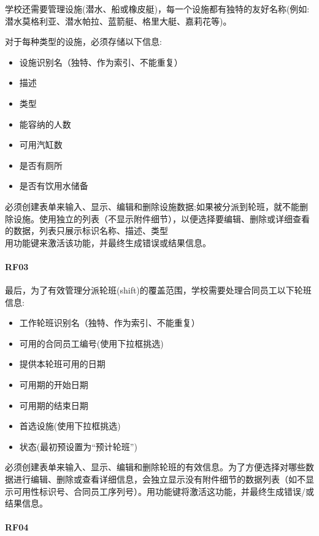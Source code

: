 学校还需要管理设施(潜水、船或橡皮艇)，每一个设施都有独特的友好名称(例如:潜水莫格利亚、潜水帕拉、蓝箭艇、格里大艇、嘉莉花等)。

对于每种类型的设施，必须存储以下信息:

\begin{itemize}
\tightlist
\item
  设施识别名（独特、作为索引、不能重复）
\item
  描述
\item
  类型
\item
  能容纳的人数
\item
  可用汽缸数
\item
  是否有厕所
\item
  是否有饮用水储备
\end{itemize}

必须创建表单来输入、显示、编辑和删除设施数据;如果被分派到轮班，就不能删除设施。使用独立的列表（不显示附件细节），以便选择要编辑、删除或详细查看的数据，列表只展示标识名称、描述、类型\\
用功能键来激活该功能，并最终生成错误或结果信息。

\hypertarget{rf03}{%
\paragraph{RF03}\label{rf03}}

最后，为了有效管理分派轮班(shift)的覆盖范围，学校需要处理合同员工以下轮班信息:

\begin{itemize}
\tightlist
\item
  工作轮班识别名（独特、作为索引、不能重复）
\item
  可用的合同员工编号(使用下拉框挑选)
\item
  提供本轮班可用的日期
\item
  可用期的开始日期
\item
  可用期的结束日期
\item
  首选设施(使用下拉框挑选)
\item
  状态(最初预设置为``预计轮班'')
\end{itemize}

必须创建表单来输入、显示、编辑和删除轮班的有效信息。为了方便选择对哪些数据进行编辑、删除或查看详细信息，会独立显示没有附件细节的数据列表（如不显示可用性标识号、合同员工序列号）。用功能键将激活这功能，并最终生成错误/或结果信息。

\hypertarget{rf04}{%
\paragraph{RF04}\label{rf04}}

